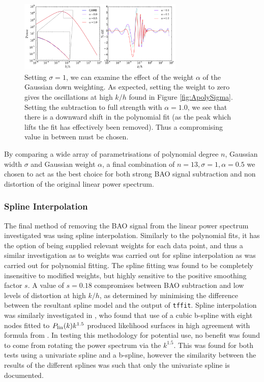 \documentclass[iop,twocolappendix]{emulateapj}
\begin{document}
	\begin{figure}
		\begin{center}
			\includegraphics[width=0.7\textwidth]{images/ApolyWeight.pdf}
			\caption{Setting $\sigma = 1$, we can examine the effect of the weight $\alpha$ of the Gaussian down weighting. As expected, setting the weight to zero gives the oscillations at high $k/h$ found in Figure \ref{fig:ApolySigma}. Setting the subtraction to full strength with $\alpha = 1.0$, we see that there is a downward shift in the polynomial fit (as the peak which lifts the fit has effectively been removed). Thus a compromising value in between must be chosen.}
			\label{fig:ApolyWeight}
		\end{center}
	\end{figure}
	
	
	By comparing a wide array of parametrisations of polynomial degree $n$, Gaussian width $\sigma$ and Gaussian weight $\alpha$, a final combination of $n=13, \sigma=1, \alpha=0.5$ we chosen to act as the best choice for both strong BAO signal subtraction and non distortion of the original linear power spectrum.

	
	\subsubsection{Spline Interpolation}
	
	
	The final method of removing the BAO signal from the linear power spectrum investigated was using spline interpolation. Similarly to the polynomial fits, it has the option of being supplied relevant weights for each data point, and thus a similar investigation as to weights was carried out for spline interpolation as was carried out for polynomial fitting. The spline fitting was found to be completely insensitive to modified weights, but highly sensitive to the positive smoothing factor $s$. A value of $s = 0.18$ compromises between BAO subtraction and low levels of distortion at high $k/h$, as determined by minimising the difference between the resultant spline model and the output of \verb;tffit;. Spline interpolation was similarly investigated in \citet{ReidPercival2010}, who found that use of a cubic b-spline with eight nodes fitted to $P_{\rm{lin}}(k) k^{1.5}$ produced likelihood surfaces in high agreement with formula from \citet{EisensteinHu1998}. In testing this methodology for potential use, no benefit was found to come from rotating the power spectrum via the $k^{1.5}$. This was found for both tests using a univariate spline and a b-spline, however the similarity between the results of the different splines was such that only the univariate spline is documented.
	
\end{document}
